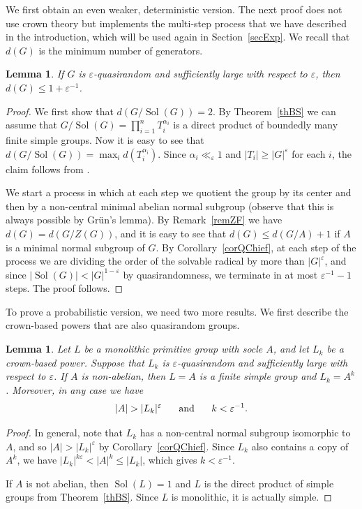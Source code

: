 \documentclass[11pt,reqno]{amsart}
\numberwithin{equation}{section}
\newtheorem{lemma}[theorem]{Lemma}
\theoremstyle{definition}
\theoremstyle{remark}
\newcommand{\Sol}{\mathop{\mathrm{Sol}}}
\begin{document}
We first obtain an even weaker, deterministic version.
The next proof does not use crown theory
but implements the multi-step process that we have described in the introduction,
which will be used again in Section~\ref{secExp}.
We recall that $d(G)$ is the minimum number of generators.

\begin{lemma} \label{lemQGen}
If $G$ is $\varepsilon$-quasirandom and sufficiently large with respect to $\varepsilon$,
then $d(G) \leq 1 + \varepsilon^{-1}$.
\end{lemma}
\begin{proof}
We first show that $d(G/\Sol(G)) =2$.
By Theorem~\ref{thBS} we can assume that $G/\Sol(G) = \prod_{i=1}^n T_i^{\alpha_i}$
is a direct product of boundedly many finite simple groups.
Now it is easy to see that $d(G/\Sol(G)) = \max_i d(T_i^{\alpha_i})$.
Since $\alpha_i \ll_\varepsilon 1$ and $|T_i| \geq |G|^\varepsilon$ for each $i$,
the claim follows from \cite[Section~4]{Wie74}.

We start a process in which at each step we quotient the group by its center
and then by a non-central minimal abelian normal subgroup
(observe that this is always possible by Gr\"un's lemma).
By Remark~\ref{remZF} we have $d(G)=d(G/Z(G))$,
and it is easy to see that $d(G) \leq d(G/A) +1$ if $A$ is a minimal normal subgroup of $G$.
By Corollary~\ref{corQChief},
at each step of the process we are dividing the order of the solvable radical by more than $|G|^\varepsilon$,
and since $|\Sol(G)| < |G|^{1-\varepsilon}$ by quasirandomness,
we terminate in at most $\varepsilon^{-1}-1$ steps.
The proof follows.
\end{proof}

To prove a probabilistic version, we need two more results.
 We first describe the crown-based powers that are also quasirandom groups.

\begin{lemma} \label{lemQCrown}
Let $L$ be a monolithic primitive group with socle $A$,
and let $L_k$ be a crown-based power.
Suppose that $L_k$ is $\varepsilon$-quasirandom and sufficiently large with respect to $\varepsilon$.
If $A$ is non-abelian, then $L=A$ is a finite simple group and $L_k=A^k$.
Moreover, in any case we have
$$ |A| > |L_k|^\varepsilon \hspace{0.5cm} \text{ and } \hspace{0.5cm} k < \varepsilon^{-1} . $$
\end{lemma}
\begin{proof}
In general, note that $L_k$ has a non-central normal subgroup isomorphic to $A$,
and so $|A| > |L_k|^\varepsilon$ by Corollary~\ref{corQChief}.
Since $L_k$ also contains a copy of $A^k$, we have $|L_k|^{k \varepsilon} < |A|^k \leq |L_k|$,
which gives $k < \varepsilon^{-1}$.

If $A$ is not abelian, then $\Sol(L)=1$ and $L$ is the direct product of simple groups from Theorem~\ref{thBS}.
Since $L$ is monolithic, it is actually simple.
\end{proof} 
\end{document}
